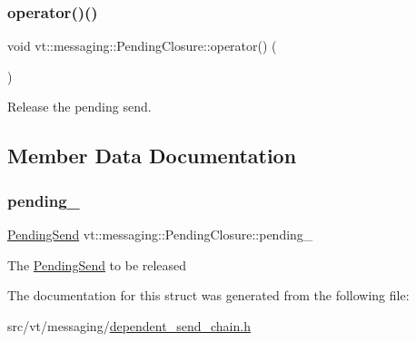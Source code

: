 \subsubsection{\texorpdfstring{operator()()}{operator()()}}
{\footnotesize\ttfamily void vt\+::messaging\+::\+Pending\+Closure\+::operator() (\begin{DoxyParamCaption}{ }\end{DoxyParamCaption})\hspace{0.3cm}{\ttfamily [inline]}}



Release the pending send. 



\subsection{Member Data Documentation}
\mbox{\label{structvt_1_1messaging_1_1_pending_closure_a8a7aa220e450d45f9a7ebec04d563bdd}} 
\subsubsection{\texorpdfstring{pending\+\_\+}{pending\_}}
{\footnotesize\ttfamily \hyperlink{structvt_1_1messaging_1_1_pending_send}{Pending\+Send} vt\+::messaging\+::\+Pending\+Closure\+::pending\+\_\+\hspace{0.3cm}{\ttfamily [private]}}

The {\ttfamily \hyperlink{structvt_1_1messaging_1_1_pending_send}{Pending\+Send}} to be released 

The documentation for this struct was generated from the following file\+:\begin{DoxyCompactItemize}
\item 
src/vt/messaging/\hyperlink{dependent__send__chain_8h}{dependent\+\_\+send\+\_\+chain.\+h}\end{DoxyCompactItemize}
